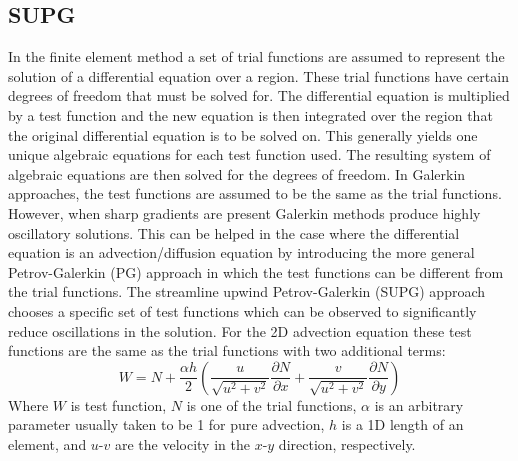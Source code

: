\subsection{SUPG}
\label{SUPG}
In the finite element method a set of trial functions are assumed to represent the solution of a differential equation over a region. These trial functions have certain degrees of freedom that must be solved for. The differential equation is multiplied by a test function and the new equation is then integrated over the region that the original differential equation is to be solved on. This generally yields one unique algebraic equations for each test function used. The resulting system of algebraic equations are then solved for the degrees of freedom. 
In Galerkin approaches, the test functions are assumed to be the same as the trial functions. However, when sharp gradients are present Galerkin methods produce highly oscillatory solutions. This can be helped in the case where the differential equation is an advection/diffusion equation by introducing the more general Petrov-Galerkin (PG) approach in which the test functions can be different from the trial functions. The streamline upwind Petrov-Galerkin (SUPG) \cite{Zienkiewicz} approach chooses a specific set of test functions which can be observed to significantly reduce oscillations in the solution. For the 2D advection equation these test functions are the same as the trial functions with two additional terms:
\begin{equation}
W = N + \frac{\alpha h}{2}\left(\frac{u}{\sqrt{u^2+v^2}}\frac{\partial N}{\partial x} + \frac{v}{\sqrt{u^2+v^2}}\frac{\partial N}{\partial y}\right)
\end{equation}
Where $W$ is test function, $N$ is one of the trial functions, $\alpha$ is an arbitrary parameter usually taken to be 1 for pure advection, $h$ is a 1D length of an element, and $u$-$v$ are the velocity in the $x$-$y$ direction, respectively.
